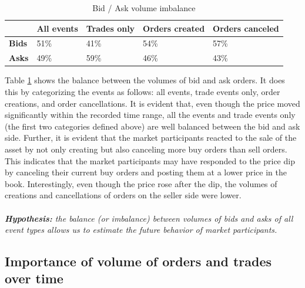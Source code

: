 \begin{table}[H]
\centering
\begin{tabular}{l|l|l|l|l|}
\cline{2-5}
& \textbf{All events} & \textbf{Trades only} & \textbf{Orders created} & \textbf{Orders canceled} \\ \hline
\multicolumn{1}{|l|}{\textbf{Bids}} & 51\%                & 41\%                 & 54\%                    & 57\%                      \\ \hline
\multicolumn{1}{|l|}{\textbf{Asks}} & 49\%                & 59\%                 & 46\%                    & 43\%                      \\ \hline
\end{tabular}
\caption{Bid / Ask volume imbalance}
\label{tbl:data-imbalance}
\end{table}

Table \ref{tbl:data-imbalance} shows the balance between the volumes of bid and ask orders. It does this by categorizing the events as follows: all events, trade events only, order creations, and order cancellations.
It is evident that, even though the price moved significantly within the recorded time range, all the events and trade events only (the first two categories defined above) are well balanced between the bid and ask side.
Further, it is evident that the market participants reacted to the sale of the asset by not only creating but also canceling more buy orders than sell orders.
This indicates that the market participants may have responded to the price dip by canceling their current buy orders and posting them at a lower price in the book.
Interestingly, even though the price rose after the dip, the volumes of creations and cancellations of orders on the seller side were lower.
\\
\\
\textit{\textbf{Hypothesis:} the balance (or imbalance) between volumes of bids and asks of all event types allows us to estimate the future behavior of market participants.}

\subsection{Importance of volume of orders and trades over time}
\label{sec:data-hypthesis-order-trade-volume-time}

